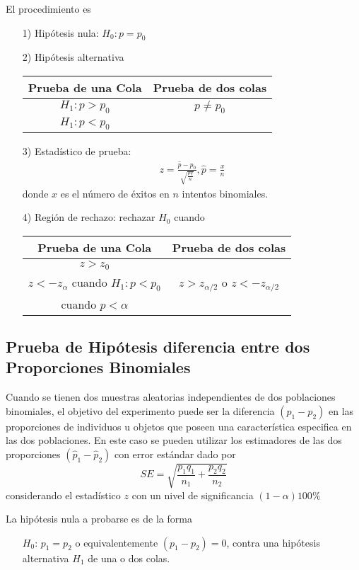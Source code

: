 El procedimiento es
\begin{itemize}
\item[1) ] Hip\'otesis nula: $H_{0}:p=p_{0}$
\item[2) ] Hip\'otesis alternativa
\begin{tabular}{cc}\hline
\textbf{Prueba de una Cola} & \textbf{Prueba de dos colas}\\\hline
$H_{1}:p>p_{0}$ & $p\neq p_{0}$\\
$H_{1}:p<p_{0}$ & \\
\end{tabular}
\item[3) ] Estad\'istico de prueba:
\begin{eqnarray*}
z=\frac{\hat{p}-p_{0}}{\sqrt{\frac{pq}{n}}},\hat{p}=\frac{x}{n}
\end{eqnarray*}
donde $x$ es el n\'umero de \'exitos en $n$ intentos binomiales.
\item[4) ] Regi\'on de rechazo: rechazar $H_{0}$ cuando
\begin{tabular}{cc}\hline
\textbf{Prueba de una Cola} & \textbf{Prueba de dos colas}\\\hline
$z>z_{0}$ & \\
$z<-z_{\alpha}$ cuando $H_{1}:p<p_{0}$&$z>z_{\alpha/2}$ o $z<-z_{\alpha/2}$\\
 cuando $p<\alpha$&\\
\end{tabular}
\end{itemize}

\subsection*{Prueba de Hip\'otesis diferencia entre dos Proporciones Binomiales}

Cuando se tienen dos muestras aleatorias independientes de dos poblaciones binomiales, el objetivo del experimento puede ser la diferencia $\left(p_{1}-p_{2}\right)$ en las proporciones de individuos u objetos que poseen una caracter\'istica especifica en las dos poblaciones. En este caso se pueden utilizar los estimadores de las dos proporciones $\left(\hat{p}_{1}-\hat{p}_{2}\right)$ con error est\'andar dado por
$$SE=\sqrt{\frac{p_{1}q_{1}}{n_{1}}+\frac{p_{2}q_{2}}{n_{2}}}$$
considerando el estad\'istico $z$ con un nivel de significancia $\left(1-\alpha\right)100\%$

La hip\'otesis nula a probarse es de la forma
\begin{itemize}
\item[$H_{0}$: ] $p_{1}=p_{2}$ o equivalentemente $\left(p_{1}-p_{2}\right)=0$, contra una hip\'otesis alternativa $H_{1}$ de una o dos colas.
\end{itemize}

